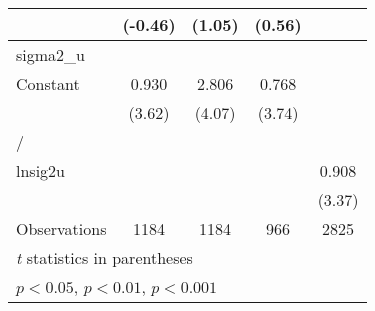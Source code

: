 {\begin{longtable}{l*{4}{c}}
                &  (-0.46)         &   (1.05)         &   (0.56)         &                  \\
\hline
sigma2\_u        &                  &                  &                  &                  \\
Constant        &    0.930\sym{***}&    2.806\sym{***}&    0.768\sym{***}&                  \\
                &   (3.62)         &   (4.07)         &   (3.74)         &                  \\
\hline
/               &                  &                  &                  &                  \\
lnsig2u         &                  &                  &                  &    0.908\sym{***}\\
                &                  &                  &                  &   (3.37)         \\
\hline
Observations    &     1184         &     1184         &      966         &     2825         \\
\hline\hline
\multicolumn{5}{l}{\footnotesize \textit{t} statistics in parentheses}\\
\multicolumn{5}{l}{\footnotesize \sym{*} \(p<0.05\), \sym{**} \(p<0.01\), \sym{***} \(p<0.001\)}\\
\end{longtable}
}
